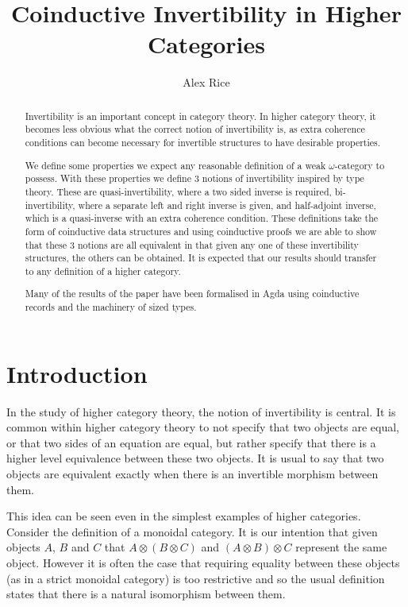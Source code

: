 \documentclass{article}
\title{Coinductive Invertibility in Higher Categories}
\author{Alex Rice}
\theoremstyle{definition}
\theoremstyle{remark}
\begin{document}
\maketitle

\listoftodos{}

\begin{abstract}
  Invertibility is an important concept in category theory. In higher category theory, it becomes less obvious what the correct notion of invertibility is, as extra coherence conditions can become necessary for invertible structures to have desirable properties.

  We define some properties we expect any reasonable definition of a weak \(\omega\)-category to possess. With these properties we define 3 notions of invertibility inspired by type theory. These are quasi-invertibility, where a two sided inverse is required, bi-invertibility, where a separate left and right inverse is given, and half-adjoint inverse, which is a quasi-inverse with an extra coherence condition. These definitions take the form of coinductive data structures and using coinductive proofs we are able to show that these 3 notions are all equivalent in that given any one of these invertibility structures, the others can be obtained. It is expected that our results should transfer to any definition of a higher category.

  Many of the results of the paper have been formalised in Agda using coinductive records and the machinery of sized types.
\end{abstract}
\section{Introduction}\label{sec:intro}

In the study of higher category theory, the notion of invertibility is central. It is common within higher category theory to not specify that two objects are equal, or that two sides of an equation are equal, but rather specify that there is a higher level equivalence between these two objects. It is usual to say that two objects are equivalent exactly when there is an invertible morphism between them.

This idea can be seen even in the simplest examples of higher categories. Consider the definition of a monoidal category. It is our intention that given objects \(A\), \(B\) and \(C\) that \(A \otimes (B \otimes C)\) and \((A \otimes B) \otimes C\) represent the same object. However it is often the case that requiring equality between these objects (as in a strict monoidal category) is too restrictive and so the usual definition states that there is a natural isomorphism between them.
\end{document}
